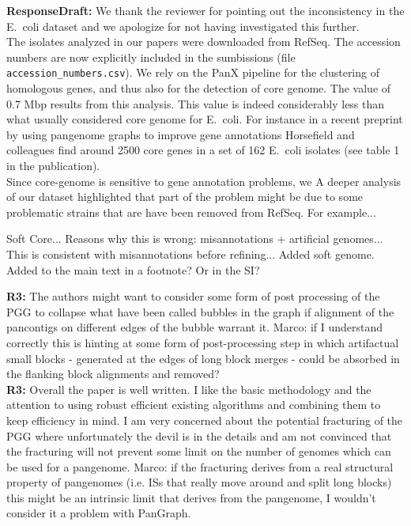 \documentclass[aps,rmp,onecolumn]{revtex4-1}
\newcommand{\Marco}[1]{{\color{gray}Marco: #1}}
\newcommand{\reviewer}[2]{\textbf{#1:} #2\vskip 5mm}
\newcommand{\responsedraft}[1]{{\it {\color{purple}\textbf{ResponseDraft:} #1}}\vskip 5mm}
\begin{document}
\responsedraft{
      We thank the reviewer for pointing out the inconsistency in the E.~coli dataset and we apologize for not having investigated this further.\\
      The isolates analyzed in our papers were downloaded from RefSeq. The accession numbers are now explicitly included in the sumbissions (file \texttt{accession\_numbers.csv}). We rely on the PanX pipeline \cite{ding2018panx} for the clustering of homologous genes, and thus also for the detection of core genome. The value of 0.7 Mbp results from this analysis. This value is indeed considerably less than what usually considered core genome for E.~coli.
      For instance in a recent preprint \cite{horsfield2023accurate} by using pangenome graphs to improve gene annotations Horsefield and colleagues find around 2500 core genes in a set of 162 E.~coli isolates (see table 1 in the publication).\\
      Since core-genome is sensitive to gene annotation problems, we
      A deeper analysis of our dataset highlighted that part of the problem might be due to some problematic strains that are have been removed from RefSeq. For example...

      Soft Core...
      Reasons why this is wrong: misannotations + artificial genomes... This is consistent with misannotations before refining...
      Added soft genome.
      Added to the main text in a footnote? Or in the SI?
}


\reviewer{R3}{The authors might want to consider some form of post processing of the PGG to collapse what have been called bubbles in the graph if alignment of the pancontigs on different edges of the bubble warrant it.}
\Marco{if I understand correctly this is hinting at some form of post-processing step in which artifactual small blocks - generated at the edges of long block merges - could be absorbed in the flanking block alignments and removed?}\\

\reviewer{R3}{Overall the paper is well written. I like the basic methodology and the attention to using robust efficient existing algorithms and combining them to keep efficiency in mind. I am very concerned about the potential fracturing of the PGG where unfortunately the devil is in the details and am not convinced that the fracturing will not prevent some limit on the number of genomes which can be used for a pangenome.}
\Marco{if the fracturing derives from a real structural property of pangenomes (i.e. ISs that really move around and split long blocks) this might be an intrinsic limit that derives from the pangenome, I wouldn't consider it a problem with PanGraph.}\\
\end{document}
